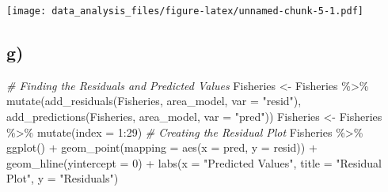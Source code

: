 \documentclass[
]{article}
\newenvironment{Shaded}{\begin{snugshade}}{\end{snugshade}}
\newcommand{\AttributeTok}[1]{\textcolor[rgb]{0.77,0.63,0.00}{#1}}
\newcommand{\CommentTok}[1]{\textcolor[rgb]{0.56,0.35,0.01}{\textit{#1}}}
\newcommand{\DecValTok}[1]{\textcolor[rgb]{0.00,0.00,0.81}{#1}}
\newcommand{\FunctionTok}[1]{\textcolor[rgb]{0.00,0.00,0.00}{#1}}
\newcommand{\NormalTok}[1]{#1}
\newcommand{\OtherTok}[1]{\textcolor[rgb]{0.56,0.35,0.01}{#1}}
\newcommand{\SpecialCharTok}[1]{\textcolor[rgb]{0.00,0.00,0.00}{#1}}
\newcommand{\StringTok}[1]{\textcolor[rgb]{0.31,0.60,0.02}{#1}}
\begin{document}
\begin{Shaded}
\end{Shaded}

\texttt{[image: data\_analysis\_files/figure-latex/unnamed-chunk-5-1.pdf]}

\hypertarget{g}{%
\subsection{g)}\label{g}}

\begin{Shaded}
\begin{Highlighting}[]
\CommentTok{\# Finding the Residuals and Predicted Values}
\NormalTok{Fisheries }\OtherTok{\textless{}{-}}\NormalTok{ Fisheries }\SpecialCharTok{\%\textgreater{}\%}
  \FunctionTok{mutate}\NormalTok{(}\FunctionTok{add\_residuals}\NormalTok{(Fisheries, }
\NormalTok{                       area\_model,}
                       \AttributeTok{var =} \StringTok{"resid"}\NormalTok{),}
         \FunctionTok{add\_predictions}\NormalTok{(Fisheries, }
\NormalTok{                         area\_model, }
                         \AttributeTok{var =} \StringTok{"pred"}\NormalTok{)) }
\NormalTok{Fisheries }\OtherTok{\textless{}{-}}\NormalTok{ Fisheries }\SpecialCharTok{\%\textgreater{}\%}
  \FunctionTok{mutate}\NormalTok{(}\AttributeTok{index =} \DecValTok{1}\SpecialCharTok{:}\DecValTok{29}\NormalTok{)}
\CommentTok{\# Creating the Residual Plot}
\NormalTok{Fisheries }\SpecialCharTok{\%\textgreater{}\%}
  \FunctionTok{ggplot}\NormalTok{() }\SpecialCharTok{+}
  \FunctionTok{geom\_point}\NormalTok{(}\AttributeTok{mapping =} \FunctionTok{aes}\NormalTok{(}\AttributeTok{x =}\NormalTok{ pred, }\AttributeTok{y =}\NormalTok{ resid)) }\SpecialCharTok{+}
  \FunctionTok{geom\_hline}\NormalTok{(}\AttributeTok{yintercept =} \DecValTok{0}\NormalTok{) }\SpecialCharTok{+}
  \FunctionTok{labs}\NormalTok{(}\AttributeTok{x =} \StringTok{"Predicted Values"}\NormalTok{,}
       \AttributeTok{title =} \StringTok{"Residual Plot"}\NormalTok{,}
       \AttributeTok{y =} \StringTok{"Residuals"}\NormalTok{)}
\end{Highlighting}
\end{Shaded}
\end{document}
